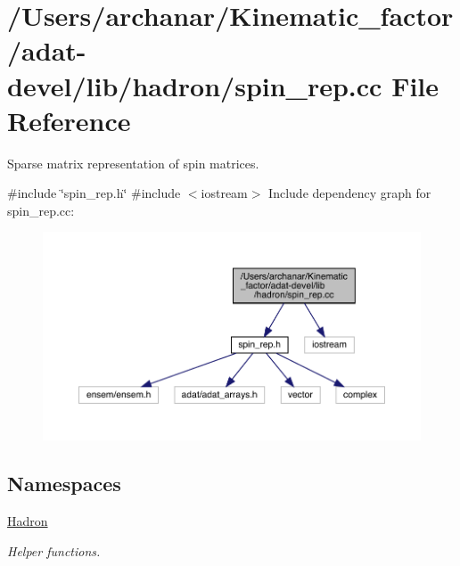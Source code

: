 \hypertarget{adat-devel_2lib_2hadron_2spin__rep_8cc}{}\section{/\+Users/archanar/\+Kinematic\+\_\+factor/adat-\/devel/lib/hadron/spin\+\_\+rep.cc File Reference}
\label{adat-devel_2lib_2hadron_2spin__rep_8cc}


Sparse matrix representation of spin matrices.  


{\ttfamily \#include \char`\"{}spin\+\_\+rep.\+h\char`\"{}}\newline
{\ttfamily \#include $<$iostream$>$}\newline
Include dependency graph for spin\+\_\+rep.\+cc\+:
\nopagebreak
\begin{figure}[H]
\begin{center}
\leavevmode
\includegraphics[width=350pt]{de/d1b/adat-devel_2lib_2hadron_2spin__rep_8cc__incl}
\end{center}
\end{figure}
\subsection*{Namespaces}
\begin{DoxyCompactItemize}
\item 
 \mbox{\hyperlink{namespaceHadron}{Hadron}}
\begin{DoxyCompactList}\small\item\em Helper functions. \end{DoxyCompactList}\end{DoxyCompactItemize}
